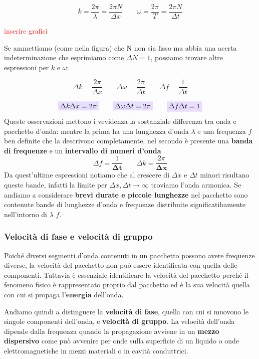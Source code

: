 \documentclass[x11names]{article}
\newcommand{\viola}[1]{\colorbox{myred}{$\displaystyle #1$}}
\begin{document}
	\[ 
	k = \frac{2\pi}{\lambda}= \frac{2\pi N}{\Delta x} \qquad \omega = \frac{2\pi}{T} = \frac{2\pi N}{\Delta t}
	\]
	
	\begin{center}
		\textcolor{red}{inserire grafici}
	\end{center}
	Se ammettiamo (come nella figura) che N non sia fisso ma abbia una acerta indeterminazione che esprimiamo come \(\Delta N = 1\), possiamo trovare altre espressioni per \(k\) e \(\omega\):
	
	\[ 
	\boxed{\Delta k = \frac{2\pi}{\Delta x}} \qquad \boxed{ \Delta\omega = \frac{2\pi}{\Delta t}} \qquad \boxed{\Delta f = \frac{1}{\Delta t}}
	\]
	
	\[ 
	\viola{\Delta k \Delta x = 2\pi} \qquad \viola{\Delta \omega \Delta t = 2\pi} \qquad \viola{\Delta f \Delta t = 1}
	\]
	Queste osservazioni mettono i vevidenza la sostanziale differenza tra onda e pacchetto d'onda: mentre la prima ha una lunghezza d'onda \(\lambda\)  e una frequenza \(f\) ben definite che la descrivono completamente, nel secondo è presente una \textbf{banda di frequenze} e un \textbf{intervallo di numeri d'onda}
	\[ 
	\Delta f = \frac{1}{\boldsymbol{\Delta t}} \qquad \Delta k = \frac{2\pi}{\boldsymbol{\Delta x}}
	\]
	Da quest'ultime espressioni notiamo che al crescere di \(\Delta x\) e \(\Delta t\) minori risultano queste bande, infatti la limite per \(\Delta x,\Delta t \to \infty\) troviamo l'onda armonica. Se andiamo a considerare \textbf{brevi durate e piccole lunghezze} nel pacchetto sono contenute bande di lunghezze d'onda e frequenze distribuite significatibamente nell'intorno di \(\lambda\) \(f\).
	
		\subsubsection{Velocità di fase e velocità di gruppo}
		Poiché diversi segmenti d'onda contenuti in un pacchetto possono avere frequenze diverse, la velocità del pacchetto non può essere identificata con quella delle componenti. Tuttavia è essenziale identificare la velocità del pacchetto perché il fenomeno fisico è rappresentato proprio dal pacchetto ed è la sua velocità quella con cui si propaga l'\textbf{energia} dell'onda.     
		
		Andiamo quindi a distinguere la \textbf{velocità di fase}, quella con cui si muovono le singole componenti dell'onda, e \textbf{velocità di gruppo}. 
		La velocità dell'onda dipende dalla frequenza quando la propagazione avviene in un \textbf{mezzo dispersivo} come può avvenire per onde sulla superficie di un liquido o onde elettromagnetiche in mezzi materiali o in cavità conduttrici.\\
		
\end{document}
